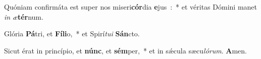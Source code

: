 ﻿\item Quóniam confirmáta est super nos miseri\textbf{cór}\-dia \textbf{e}jus~:~* et véritas Dómini manet \emph{in} \emph{æ}\textbf{tér}num.
\item Glória \textbf{Pá}tri, et \textbf{Fí}\-\textbf{li}\-o,~* et Spirí\-\emph{tu}\emph{i} \textbf{Sán}cto.
\item Sicut érat in princípio, et \textbf{núnc}, et \textbf{sém}\-per,~* et in sǽcula sæcu\emph{ló}\emph{rum}. \textbf{A}men.